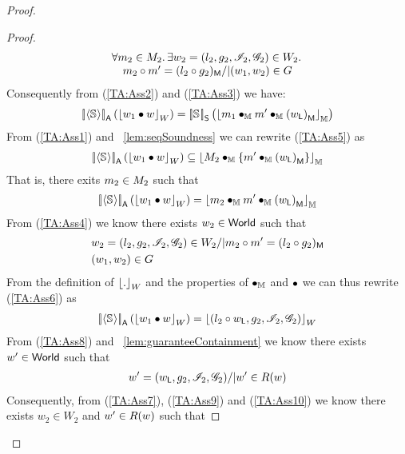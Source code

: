 \begin{theorem}
\begin{proof}
\begin{proof}
\begin{align}
\begin{array}{@{} l @{} }
		\for{m_2 \in M_2} \exsts{w_2 = (l_2, g_2, \lmod_2, \gmod_2) \in W_2}\\
		\quad m_2 \composeL m' = 	\heapPart{(l_2  \composeL  g_2)} /| (w_1, w_2) \in \guarantee
	\end{array}
	\label{TA:Ass4}
\end{align}
Consequently from (\ref{TA:Ass2}) and (\ref{TA:Ass3}) we have:
%
\begin{align}
	\left[\!\left| \left\langle \mathbb{S}_{} \right\rangle \right |\! \right]_{\textsf{A}}\left( \left\lfloor w_1 \bullet w \right\rfloor_{W} \right) = \left[\!\left| \mathbb{S}_{} \right |\! \right]_{\textsf{S}}\left( \left\lfloor m_{1} \bullet_{\mathbb{M}} m_{}' \bullet_{\mathbb{M}} \left(w_{\textsf{L}}\right)_{\textsf{M}} \right\rfloor_{\mathbb{M}} \right)
	\label{TA:Ass5}
\end{align}
From (\ref{TA:Ass1}) and \lem~\ref{lem:seqSoundness} we can rewrite (\ref{TA:Ass5}) as
%
\begin{align*}
	\left[\!\left| \left\langle \mathbb{S}_{} \right\rangle \right |\! \right]_{\textsf{A}}\left( \left\lfloor w_1 \bullet w \right\rfloor_{W} \right) \subseteq  \left\lfloor M_{2} \bullet_{\mathbb{M}} \{ m_{}' \bullet_{\mathbb{M}} \left(w_{\textsf{L}}\right)_{\textsf{M}} \}  \right\rfloor_{\mathbb{M}}
\end{align*}
That is, there exits $m_{2} \in M_{2}$ such that 
%
\begin{align}
	\left[\!\left| \left\langle \mathbb{S}_{} \right\rangle \right |\! \right]_{\textsf{A}}\left( \left\lfloor w_1 \bullet w \right\rfloor_{W} \right) =  \left\lfloor m_{2} \bullet_{\mathbb{M}} m_{}' \bullet_{\mathbb{M}} \left(w_{\textsf{L}}\right)_{\textsf{M}}  \right\rfloor_{\mathbb{M}}
	\label{TA:Ass6}
\end{align}
%
From (\ref{TA:Ass4}) we know there exists $w_2 \in \textsf{World}$ such that
\begin{align}
	& w_2 = (l_2, g_2, \mathscr{I}_2, \mathscr{G}_2) \in W_2 /| m_2 \circ m' = 	(l_2  \circ  g_2)_{\textsf{M}} \label{TA:Ass7}\\
	& (w_1, w_2) \in G	\label{TA:Ass8}
\end{align} 
%
From the definition of $\left\lfloor . \right\rfloor_{W}$ and the properties of $\bullet_{\mathbb{M}}$ and $\bullet$ we can thus rewrite (\ref{TA:Ass6}) as 
\begin{align}
	\left[\!\left| \left\langle \mathbb{S}_{} \right\rangle \right |\! \right]_{\textsf{A}}\left( \left\lfloor w_1 \bullet w \right\rfloor_{W} \right) =  \left\lfloor (l_2 \circ w_{\textsf{L}}, g_2, \mathscr{I}_2, \mathscr{G}_2) \right\rfloor_{W}
	\label{TA:Ass9}
\end{align}
%
From (\ref{TA:Ass8}) and \lem~\ref{lem:guaranteeContainment} we know there exists $w' \in \textsf{World}$ such that
%
\begin{align}
	w' = (w_{\textsf{L}}, g_2, \mathscr{I}_2, \mathscr{G}_2) /| w' \in R(w) 
	\label{TA:Ass10}
\end{align}
Consequently, from (\ref{TA:Ass7}), (\ref{TA:Ass9}) and (\ref{TA:Ass10}) we know there exists $w_2 \in W_2$ and $w' \in R(w)$ such that 

\end{proof}
\end{proof}
\end{theorem}
